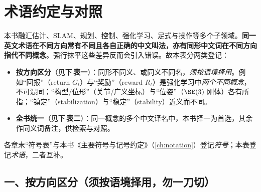 \chapter*{术语约定与对照}
\label{ch:terminology}

本书融汇估计、SLAM、规划、控制、强化学习、足式与操作等多个子领域。\textbf{同一英文术语在不同方向常有不同且各自正确的中文叫法，亦有同形中文词在不同方向指代不同概念}。强行抹平这些差异反而会引入错误。故本表分两类登记：

\begin{itemize}
  \item \textbf{按方向区分}（见下\,\textbf{表一}）：同形不同义、或同义不同名，\emph{须按语境择用}。例如“回报”（return $G_t$）与“奖励”（reward $R_t$）是强化学习中\emph{两个不同概念}，不可混同；“构型/位形”（关节/广义坐标）与“位姿”（$\SE(3)$ 刚体）各有所指；“镇定”（stabilization）与“稳定”（stability）近义而不同。
  \item \textbf{全书统一}（见下\,\textbf{表二}）：同一概念的多个中文译名中，本书择一为首选，其余作同义词备注，供检索与对照。
\end{itemize}

各章末“符号表”与本书《主要符号与记号约定》（\cref{ch:notation}）登记\emph{符号}；本表登记\emph{术语}，二者互补。

\section*{一、按方向区分（须按语境择用，勿一刀切）}

